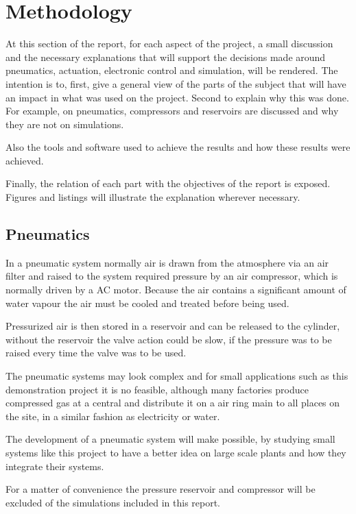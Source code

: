\documentclass[transmag]{IEEEtran}
\begin{document}
\section{Methodology}

At this section of the report, for each aspect of the project, a small discussion  and the necessary explanations that will support the decisions made around pneumatics, actuation, electronic control and simulation, will be rendered. 
The intention is to, first, give a general view of the parts of the subject that will have an impact in what was used on the project. Second to explain why this was done. For example, on pneumatics, compressors and reservoirs are discussed and why they are not on simulations.

Also the tools and software used to achieve the results and how these results were achieved.

Finally, the relation of each part with the objectives of the report is exposed. Figures and listings will illustrate the explanation wherever necessary.

\subsection{Pneumatics}

In a pneumatic system normally air is drawn from the atmosphere via an air filter and raised to the system required pressure by an air compressor, which is normally driven by a AC motor. \cite{ref1} Because the air contains a significant amount of water vapour the air must be cooled and treated before being used. 

Pressurized air is then stored in a reservoir and can be released to the cylinder, without the reservoir the valve action could be slow, if the pressure was to be raised every time the valve was to be used.

The pneumatic systems may look complex and for small applications such as this demonstration project it is no feasible, although many factories produce compressed gas  at a central and distribute it on a air ring main to all places on the site, in a similar fashion as electricity or water.

The development of a pneumatic system will make possible, by studying small systems like this project to have a better idea on large scale plants and how they integrate their systems.

For a matter of convenience the pressure reservoir and compressor will be excluded of the simulations included in this report.
\end{document}
